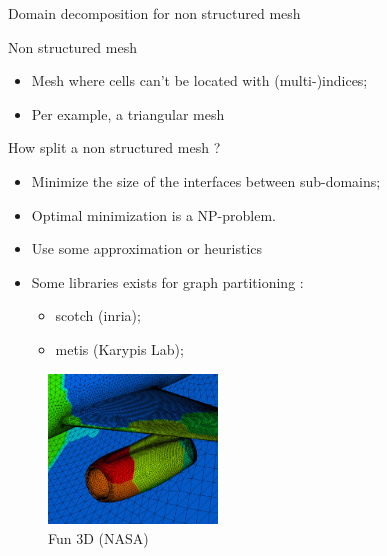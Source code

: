 \documentclass[compress,10pt,aspectratio=169]{beamer}
\begin{document}
\begin{frame}[fragile]{Domain decomposition for non structured mesh}
    \scriptsize

    \begin{multicols}{2}
    \begin{block}{\small Non structured mesh}
        \begin{itemize}
            \item Mesh where cells can't be located with (multi-)indices;
            \item Per example, a triangular mesh
        \end{itemize}
    \end{block}

    \begin{exampleblock}{\small How split a non structured mesh ?}
        \begin{itemize}
            \item Minimize the size of the interfaces between sub-domains;
            \item Optimal minimization is a NP-problem. 
            \item Use some approximation or heuristics
            \item Some libraries exists for graph partitioning :
            \begin{itemize}
                \item {\scriptsize scotch (inria);}
                \item {\scriptsize metis (Karypis Lab)};
            \end{itemize}
        \end{itemize}
    \end{exampleblock}

    \begin{figure}[h]
    \includegraphics[width=0.40\textwidth]{../Images/grid_decomposition.png}
    \caption{Fun 3D (NASA)}
    \end{figure}
\end{multicols}
\end{frame}
\end{document}
